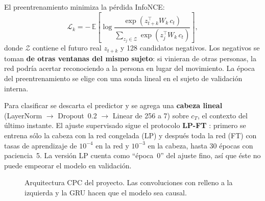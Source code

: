 \documentclass[letterpaper,11pt]{article}
\begin{document}
El preentrenamiento minimiza la pérdida InfoNCE:
\begin{equation}
  \mathcal{L}_k = -\,\mathbb{E}\left[\log \frac{\exp\!\left(z_{t+k}^{\top} W_k\, c_t\right)}{\sum_{z_j \in \mathcal{Z}} \exp\!\left(z_j^{\top} W_k\, c_t\right)}\right],
  \label{eq:infonce}
\end{equation}
donde $\mathcal{Z}$ contiene el futuro real $z_{t+k}$ y 128 candidatos negativos. Los negativos se toman \textbf{de otras ventanas del mismo sujeto}: si vinieran de otras personas, la red podría acertar reconociendo a la persona en lugar del movimiento. La época del preentrenamiento se elige con una sonda lineal en el sujeto de validación interna.

Para clasificar se descarta el predictor y se agrega una \textbf{cabeza lineal} (LayerNorm $\to$ Dropout~0.2 $\to$ Linear de 256 a 7) sobre $c_T$, el contexto del último instante. El ajuste supervisado sigue el protocolo \textbf{LP-FT} \parencite{kumar2022}: primero se entrena sólo la cabeza con la red congelada (LP) y después toda la red (FT) con tasas de aprendizaje de $10^{-4}$ en la red y $10^{-3}$ en la cabeza, hasta 30 épocas con paciencia~5. La versión LP cuenta como ``época~0'' del ajuste fino, así que éste no puede empeorar el modelo en validación.

\begin{figure}[H]
\centering
{}
\caption{Arquitectura CPC del proyecto. Las convoluciones con relleno a la izquierda y la GRU hacen que el modelo sea causal.}
\label{fig:arquitectura}
\end{figure}
\end{document}
